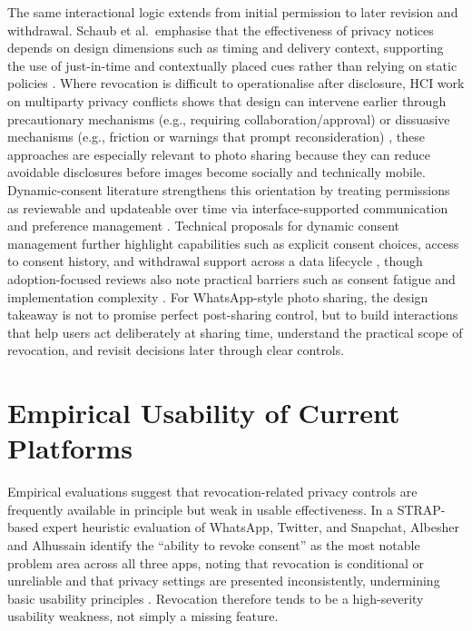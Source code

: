 The same interactional logic extends from initial permission to later revision and withdrawal. Schaub et al.\ emphasise that the effectiveness of privacy notices depends on design dimensions such as timing and delivery context, supporting the use of just-in-time and contextually placed cues rather than relying on static policies \cite{schaub_notice_2015}. Where revocation is difficult to operationalise after disclosure, HCI work on multiparty privacy conflicts shows that design can intervene earlier through precautionary mechanisms (e.g., requiring collaboration/approval) or dissuasive mechanisms (e.g., friction or warnings that prompt reconsideration) \cite{cherubini_2021}, these approaches are especially relevant to photo sharing because they can reduce avoidable disclosures before images become socially and technically mobile. Dynamic-consent literature strengthens this orientation by treating permissions as reviewable and updateable over time via interface-supported communication and preference management \cite{kaye_dynamic_2015,schuler_scott_dynamic_consent_2022,lee_identifying_2023}. Technical proposals for dynamic consent management further highlight capabilities such as explicit consent choices, access to consent history, and withdrawal support across a data lifecycle \cite{merlec_smart_2021}, though adoption-focused reviews also note practical barriers such as consent fatigue and implementation complexity \cite{lee_identifying_2023}. For WhatsApp-style photo sharing, the design takeaway is not to promise perfect post-sharing control, but to build interactions that help users act deliberately at sharing time, understand the practical scope of revocation, and revisit decisions later through clear controls.

\section{Empirical Usability of Current Platforms}
Empirical evaluations suggest that revocation-related privacy controls are frequently available in principle but weak in usable effectiveness. In a STRAP-based expert heuristic evaluation of WhatsApp, Twitter, and Snapchat, Albesher and Alhussain identify the ``ability to revoke consent'' as the most notable problem area across all three apps, noting that revocation is conditional or unreliable and that privacy settings are presented inconsistently, undermining basic usability principles \cite{albesher_2021}. Revocation therefore tends to be a high-severity usability weakness, not simply a missing feature.

